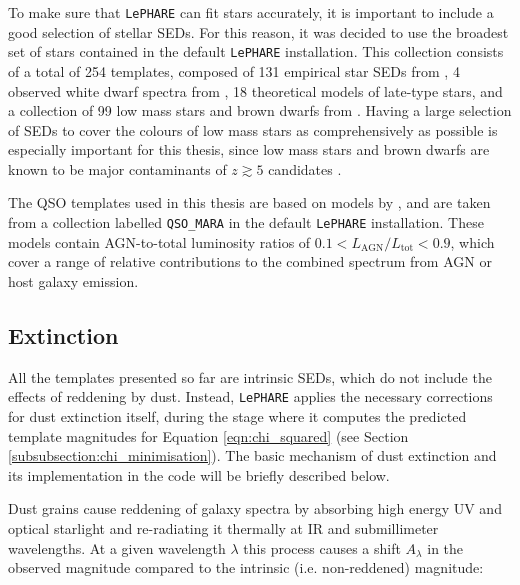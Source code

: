 To make sure that \texttt{LePHARE} can fit stars accurately, it is important to include a good selection of stellar SEDs. For this reason, it was decided to use the broadest set of stars contained in the default \texttt{LePHARE} installation. This collection consists of a total of 254 templates, composed of 131 empirical star SEDs from \cite{1998PASP..110..863P}, 4 observed white dwarf spectra from \cite{1995AJ....110.1316B}, 18 theoretical models of late-type stars, and a collection of 99 low mass stars and brown dwarfs from \cite{2000ApJ...542..464C}. Having a large selection of SEDs to cover the colours of low mass stars as comprehensively as possible is especially important for this thesis, since low mass stars and brown dwarfs are known to be major contaminants of $z\gtrsim5$ candidates \citep{2009MNRAS.395.2196M,2013AJ....145....4W,2015MNRAS.452.1817B,2016PASA...33...37F}. \par


The QSO templates used in this thesis are based on models by \cite{2009ApJ...690.1250S}, and are taken from a collection labelled \texttt{QSO\_MARA} in the default \texttt{LePHARE} installation. These models contain  AGN-to-total luminosity ratios of $0.1<L_{\mathrm{AGN}}/L_{\mathrm{tot}}<0.9$, which cover a range of relative contributions to the combined spectrum from AGN or host galaxy emission. \par


\subsection{Extinction}\label{subsection:extinction}
All the templates presented so far are intrinsic SEDs, which do not include the effects of reddening by dust. Instead, \texttt{LePHARE} applies the necessary corrections for dust extinction itself, during the stage where it computes the predicted template magnitudes for Equation \ref{eqn:chi_squared} (see Section \ref{subsubsection:chi_minimisation}). The basic mechanism of dust extinction and its implementation in the code will be briefly described below. \par



Dust grains cause reddening of galaxy spectra by absorbing high energy UV and optical starlight and re-radiating it thermally at IR and submillimeter wavelengths. At a given wavelength $\lambda$ this process causes a shift $A_{\lambda}$ in the observed magnitude compared to the intrinsic (i.e. non-reddened) magnitude:

